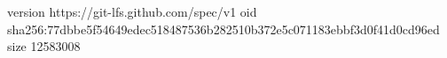 version https://git-lfs.github.com/spec/v1
oid sha256:77dbbe5f54649edec518487536b282510b372e5c071183ebbf3d0f41d0cd96ed
size 12583008
